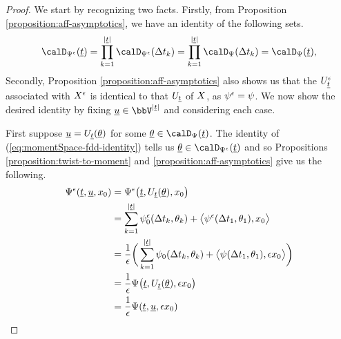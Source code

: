 \begin{proof}
  \label{proof:proposition:aff-fdd-asymptotics}
  We start by recognizing two facts.
  Firstly, from Proposition \ref{proposition:aff-asymptotics}, we have an identity of the following sets.
  \begin{equation}
    \label{eq:momentSpace-fdd-identity}
    \momentSpacee(\underline t) = \prod_{k=1}^{|\underline t|} \momentSpacee(\Delta t_k) = \prod_{k=1}^{|\underline t|} \momentSpace(\Delta t_k) = \momentSpace(\underline t),
  \end{equation}
  Secondly, Proposition \ref{proposition:aff-asymptotics} also shows us that the $U^\epsilon_{\underline t}$ associated with $X^\epsilon$ is identical to that $U_{\underline t}$ of $X$, as $\psi^\epsilon = \psi$.
  We now show the desired identity by fixing $\underline\momentVar \in \vecSpace^{|\underline t|}$ and considering each case.

  First suppose $\underline{u} = U_{\underline t}(\underline{\theta})$ for some $\underline\twistVar \in \momentSpace(\underline t)$.
  The identity of (\ref{eq:momentSpace-fdd-identity}) tells us $\underline\twistVar \in \momentSpacee(\underline t)$ and so Propositions \ref{proposition:twist-to-moment} and \ref{proposition:aff-asymptotics} give us the following.
  \begin{align*}
    \Psi^\epsilon(\underline t, \underline{u}, x_0)
    &= \Psi^\epsilon\big(\underline t, U_{\underline t}(\underline{\theta}), x_0\big) \\
    &= \sum_{k=1}^{|\underline t|} \psi^\epsilon_0(\Delta t_k, \theta_k) + {\big\langle \psi^\epsilon(\Delta t_1, \theta_1) , x_0 \big\rangle} \\
    &= \frac1\epsilon \bigg( \sum_{k=1}^{|\underline t|} \psi_0(\Delta t_k, \theta_k) + {\big\langle \psi(\Delta t_1, \theta_1) , \epsilon x_0 \big\rangle} \bigg) \\
    &= \frac1\epsilon \Psi\big(\underline t, U_{\underline t}(\underline{\theta}), \epsilon x_0\big) \\
    &= \frac1\epsilon \Psi(\underline t, \underline{u}, \epsilon x_0)
  \end{align*}


\end{proof}
